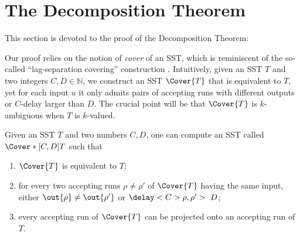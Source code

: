 \documentclass{article}
\newcommand{\RestateGo}[1]{\renewcommand{#1}{(Restated)}}
\begin{document}
\section{The Decomposition Theorem}\label{sec:decomposition}


This section is devoted to the proof of the Decomposition Theorem:
\RestateGo{\restateDecomposition}
\Decomposition*

 
Our proof relies on the notion of 
\emph{cover} of an SST, which is
reminiscent of the so-called ``lag-separation covering''
construction \cite{deSouza-thesis,SakarovitchDeSouzaMFCS08}.
Intuitively, given an SST $T$ and 
two integers $C,D \in \mathbb{N}$,
we construct an SST $\Cover{T}$
that is equivalent to $T$,
yet for each input $u$ it only admits 
pairs of accepting runs with 
different outputs or $C$-delay larger than $D$. 
The crucial point will be that $\Cover{T}$ is $k$-ambiguous when $T$ is $k$-valued. 



\begin{proposition}\label{prop:separation-covering}
Given an SST $T$ and two numbers $C,D$, 
one can compute an SST called
$\Cover*[C,D]{T}$ such that
\begin{enumerate}
\item $\Cover{T}$ is equivalent to $T$;
\item for every two accepting runs $\rho\neq\rho'$ of $\Cover{T}$ 
      having the same input, 
      either $\out{\rho} \neq \out{\rho'}$ or $\delay<C>{\rho,\rho'} >~D$;
\item every accepting run of $\Cover{T}$ can be projected onto an accepting run of $T$.
\end{enumerate}
\end{proposition}
\end{document}
